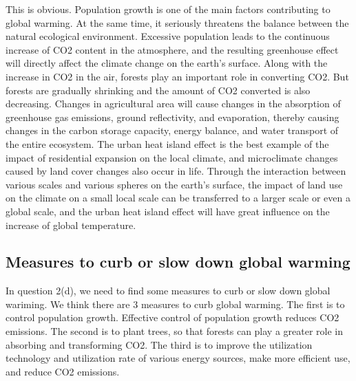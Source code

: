 \documentclass{apmcmthesis}
\begin{document}
This is obvious. 
Population growth is one of the main factors contributing to global warming. 
At the same time, it seriously threatens the balance between the natural ecological environment. 
Excessive population leads to the continuous increase of CO2 content in the atmosphere, and the resulting greenhouse effect will directly affect the climate change on the earth's surface. 
Along with the increase in CO2 in the air, forests play an important role in converting CO2. 
But forests are gradually shrinking and the amount of CO2 converted is also decreasing. 
Changes in agricultural area will cause changes in the absorption of greenhouse gas emissions, ground reflectivity, and evaporation, 
thereby causing changes in the carbon storage capacity, energy balance, and water transport of the entire ecosystem. 
The urban heat island effect is the best example of the impact of residential expansion on the local climate, and microclimate changes caused by land cover changes also occur in life. 
Through the interaction between various scales and various spheres on the earth's surface, the impact of land use on the climate on a small local scale can be transferred to a larger scale or even a global scale, 
and the urban heat island effect will have great influence on the increase of global temperature.

\subsection{Measures to curb or slow down global warming}
In question 2(d), we need to find some measures to curb or slow down global wariming.
We think there are 3 measures to curb global warming. The first is to control population growth. 
Effective control of population growth reduces CO2 emissions. 
The second is to plant trees, so that forests can play a greater role in absorbing and transforming CO2. 
The third is to improve the utilization technology and utilization rate of various energy sources, make more efficient use, and reduce CO2 emissions.



\newpage
\end{document}
